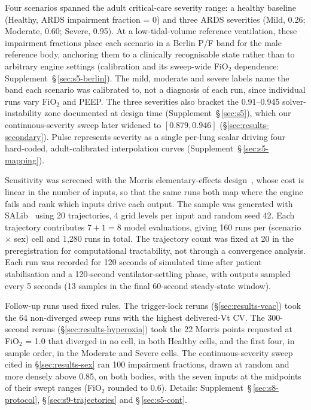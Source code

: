 \documentclass[pdflatex,sn-nature]{sn-jnl}%
\begin{document}
Four scenarios spanned the adult critical-care severity range: a healthy baseline (Healthy, ARDS impairment fraction = 0) and three ARDS severities (Mild, 0.26; Moderate, 0.60; Severe, 0.95). At a low-tidal-volume reference ventilation, these impairment fractions place each scenario in a Berlin P/F band for the male reference body, anchoring them to a clinically recognisable state rather than to arbitrary engine settings (calibration and its sweep-wide FiO$_2$ dependence: Supplement~\S\,\ref{sec:s5-berlin}). The mild, moderate and severe labels name the band each scenario was calibrated to, not a diagnosis of each run, since individual runs vary FiO$_2$ and PEEP. The three severities also bracket the 0.91--0.945 solver-instability zone documented at design time (Supplement~\S\,\ref{sec:s5}), which our continuous-severity sweep later widened to $[0.879, 0.946]$ (\S\ref{sec:results-secondary}). Pulse represents severity as a single per-lung scalar driving four hard-coded, adult-calibrated interpolation curves (Supplement~\S\,\ref{sec:s5-mapping}).

Sensitivity was screened with the Morris elementary-effects design~\cite{morris1991, campolongo2007}, whose cost is linear in the number of inputs, so that the same runs both map where the engine fails and rank which inputs drive each output. The sample was generated with SALib~\cite{iwanaga2022,herman2017salib} using 20 trajectories, 4 grid levels per input and random seed 42. Each trajectory contributes $7 + 1 = 8$ model evaluations, giving 160 runs per (scenario $\times$ sex) cell and 1{,}280 runs in total. The trajectory count was fixed at 20 in the preregistration for computational tractability, not through a convergence analysis. Each run was recorded for 120 seconds of simulated time after patient stabilisation and a 120-second ventilator-settling phase, with outputs sampled every 5 seconds (13 samples in the final 60-second steady-state window).

Follow-up runs used fixed rules. The trigger-lock reruns (\S\ref{sec:results-vcac}) took the 64 non-diverged sweep runs with the highest delivered-Vt CV. The 300-second reruns (\S\ref{sec:results-hyperoxia}) took the 22 Morris points requested at FiO$_2$ = 1.0 that diverged in no cell, in both Healthy cells, and the first four, in sample order, in the Moderate and Severe cells. The continuous-severity sweep cited in \S\ref{sec:results-sex} ran 100 impairment fractions, drawn at random and more densely above 0.85, on both bodies, with the seven inputs at the midpoints of their swept ranges (FiO$_2$ rounded to 0.6). Details: Supplement~\S\,\ref{sec:s8-protocol}, \S\,\ref{sec:s9-trajectories} and \S\,\ref{sec:s5-cont}.
\end{document}
